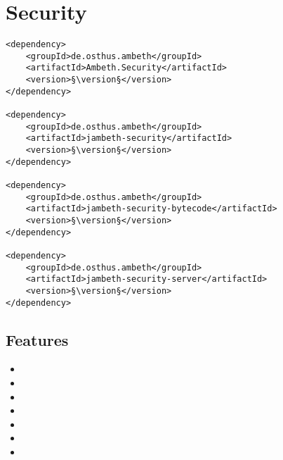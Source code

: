 \section{Security}
\label{module:Security}
\ClearAPI
\TODO
\begin{lstlisting}[style=POM,caption={Maven modules to use \emph{Ambeth Security}}]
<dependency>
	<groupId>de.osthus.ambeth</groupId>
	<artifactId>Ambeth.Security</artifactId>
	<version>§\version§</version>
</dependency>

<dependency>
	<groupId>de.osthus.ambeth</groupId>
	<artifactId>jambeth-security</artifactId>
	<version>§\version§</version>
</dependency>

<dependency>
	<groupId>de.osthus.ambeth</groupId>
	<artifactId>jambeth-security-bytecode</artifactId>
	<version>§\version§</version>
</dependency>

<dependency>
	<groupId>de.osthus.ambeth</groupId>
	<artifactId>jambeth-security-server</artifactId>
	<version>§\version§</version>
</dependency>
\end{lstlisting}
\subsection{Features}
\begin{itemize}
	\item {}
	\item {}
	\item {}
	\item {}
	\item {}
	\item {}
	\item {}
\end{itemize}

